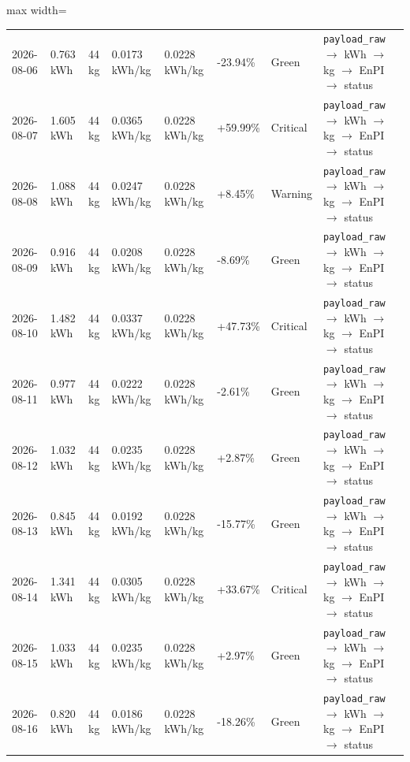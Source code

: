 \documentclass{ieeeaccess}
\begin{document}
\begin{table}[!t]
\begin{adjustbox}{max width=\textwidth}
\begin{tabular}{p{}p{}p{}p{}p{}p{}p{}p{}}
2026-08-06 & 0.763 kWh & 44 kg & 0.0173 kWh/kg & 0.0228 kWh/kg & -23.94\% & Green & \texttt{payload\_raw} $\rightarrow$ kWh $\rightarrow$ kg $\rightarrow$ EnPI $\rightarrow$ status \\
2026-08-07 & 1.605 kWh & 44 kg & 0.0365 kWh/kg & 0.0228 kWh/kg & +59.99\% & Critical & \texttt{payload\_raw} $\rightarrow$ kWh $\rightarrow$ kg $\rightarrow$ EnPI $\rightarrow$ status \\
2026-08-08 & 1.088 kWh & 44 kg & 0.0247 kWh/kg & 0.0228 kWh/kg & +8.45\% & Warning & \texttt{payload\_raw} $\rightarrow$ kWh $\rightarrow$ kg $\rightarrow$ EnPI $\rightarrow$ status \\
2026-08-09 & 0.916 kWh & 44 kg & 0.0208 kWh/kg & 0.0228 kWh/kg & -8.69\% & Green & \texttt{payload\_raw} $\rightarrow$ kWh $\rightarrow$ kg $\rightarrow$ EnPI $\rightarrow$ status \\
2026-08-10 & 1.482 kWh & 44 kg & 0.0337 kWh/kg & 0.0228 kWh/kg & +47.73\% & Critical & \texttt{payload\_raw} $\rightarrow$ kWh $\rightarrow$ kg $\rightarrow$ EnPI $\rightarrow$ status \\
2026-08-11 & 0.977 kWh & 44 kg & 0.0222 kWh/kg & 0.0228 kWh/kg & -2.61\% & Green & \texttt{payload\_raw} $\rightarrow$ kWh $\rightarrow$ kg $\rightarrow$ EnPI $\rightarrow$ status \\
2026-08-12 & 1.032 kWh & 44 kg & 0.0235 kWh/kg & 0.0228 kWh/kg & +2.87\% & Green & \texttt{payload\_raw} $\rightarrow$ kWh $\rightarrow$ kg $\rightarrow$ EnPI $\rightarrow$ status \\
2026-08-13 & 0.845 kWh & 44 kg & 0.0192 kWh/kg & 0.0228 kWh/kg & -15.77\% & Green & \texttt{payload\_raw} $\rightarrow$ kWh $\rightarrow$ kg $\rightarrow$ EnPI $\rightarrow$ status \\
2026-08-14 & 1.341 kWh & 44 kg & 0.0305 kWh/kg & 0.0228 kWh/kg & +33.67\% & Critical & \texttt{payload\_raw} $\rightarrow$ kWh $\rightarrow$ kg $\rightarrow$ EnPI $\rightarrow$ status \\
2026-08-15 & 1.033 kWh & 44 kg & 0.0235 kWh/kg & 0.0228 kWh/kg & +2.97\% & Green & \texttt{payload\_raw} $\rightarrow$ kWh $\rightarrow$ kg $\rightarrow$ EnPI $\rightarrow$ status \\
2026-08-16 & 0.820 kWh & 44 kg & 0.0186 kWh/kg & 0.0228 kWh/kg & -18.26\% & Green & \texttt{payload\_raw} $\rightarrow$ kWh $\rightarrow$ kg $\rightarrow$ EnPI $\rightarrow$ status \\
\bottomrule
\end{tabular}
\end{adjustbox}
\end{table}
\end{document}
